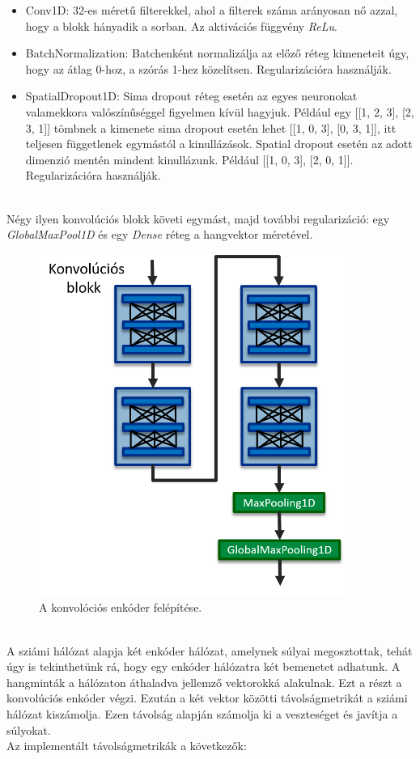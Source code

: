 \begin{itemize}
	\item Conv1D: 32-es méretű filterekkel, ahol a filterek száma arányosan nő azzal, hogy a blokk hányadik a sorban. Az aktivációs függvény \emph{ReLu}.
	\item BatchNormalization: Batchenként normalizálja az előző réteg kimeneteit úgy, hogy az átlag 0-hoz, a szórás 1-hez közelítsen. Regularizációra használják.
	\item SpatialDropout1D: Sima dropout réteg esetén az egyes neuronokat valamekkora valószínűséggel figyelmen kívül hagyjuk. Például egy [[1, 2, 3], [2, 3, 1]] tömbnek a kimenete sima dropout esetén lehet [[1, 0, 3], [0, 3, 1]], itt teljesen függetlenek egymástól a kinullázások. Spatial dropout esetén az adott dimenzió mentén mindent kinullázunk. Például [[1, 0, 3], [2, 0, 1]]. Regularizációra használják.
\end{itemize}
\ \\
Négy ilyen konvolúciós blokk követi egymást, majd további regularizáció: egy \emph{GlobalMaxPool1D} és egy \emph{Dense} réteg a hangvektor méretével.

\begin{figure}[!ht]
	\centering
	\includegraphics[width=100mm, keepaspectratio]{figures/conv_encoder.png}
	\caption{A konvolóciós enkóder felépítése.}
	\label{fig:conv_encoder}
\end{figure}
\ \\
A sziámi hálózat alapja két enkóder hálózat, amelynek súlyai megosztottak, tehát úgy is tekinthetünk rá, hogy egy enkóder hálózatra két bemenetet adhatunk. A hangminták a hálózaton áthaladva jellemző vektorokká alakulnak. Ezt a részt a konvolúciós enkóder végzi. Ezután a két vektor közötti távolságmetrikát a sziámi hálózat kiszámolja. Ezen távolság alapján számolja ki a veszteséget és javítja a súlyokat.
\ \\
Az implementált távolságmetrikák a következők:


